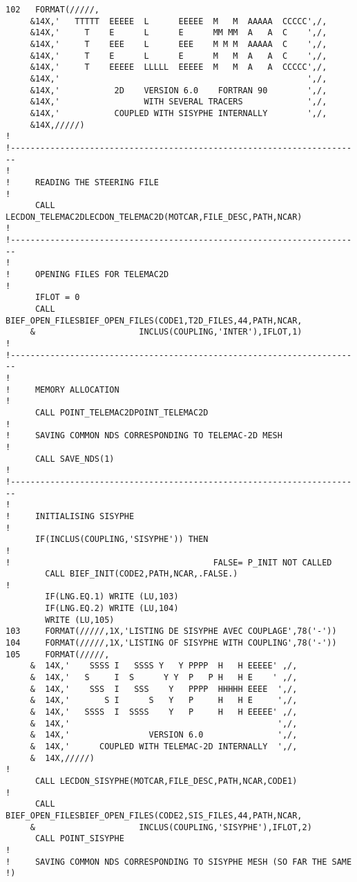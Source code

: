 \begin{lstlisting}[language=TelFortran]
102   FORMAT(/////,
     &14X,'   TTTTT  EEEEE  L      EEEEE  M   M  AAAAA  CCCCC',/,
     &14X,'     T    E      L      E      MM MM  A   A  C    ',/,
     &14X,'     T    EEE    L      EEE    M M M  AAAAA  C    ',/,
     &14X,'     T    E      L      E      M   M  A   A  C    ',/,
     &14X,'     T    EEEEE  LLLLL  EEEEE  M   M  A   A  CCCCC',/,
     &14X,'                                                  ',/,
     &14X,'           2D    VERSION 6.0    FORTRAN 90        ',/,
     &14X,'                 WITH SEVERAL TRACERS             ',/,
     &14X,'           COUPLED WITH SISYPHE INTERNALLY        ',/,
     &14X,/////)
!
!-----------------------------------------------------------------------
!
!     READING THE STEERING FILE
!
      CALL LECDON_TELEMAC2DLECDON_TELEMAC2D(MOTCAR,FILE_DESC,PATH,NCAR)
!
!-----------------------------------------------------------------------
!
!     OPENING FILES FOR TELEMAC2D
!
      IFLOT = 0
      CALL BIEF_OPEN_FILESBIEF_OPEN_FILES(CODE1,T2D_FILES,44,PATH,NCAR,
     &                     INCLUS(COUPLING,'INTER'),IFLOT,1)
!
!-----------------------------------------------------------------------
!
!     MEMORY ALLOCATION
!
      CALL POINT_TELEMAC2DPOINT_TELEMAC2D
!
!     SAVING COMMON NDS CORRESPONDING TO TELEMAC-2D MESH
!
      CALL SAVE_NDS(1)
!
!-----------------------------------------------------------------------
!
!     INITIALISING SISYPHE
!
      IF(INCLUS(COUPLING,'SISYPHE')) THEN
!
!                                         FALSE= P_INIT NOT CALLED
        CALL BIEF_INIT(CODE2,PATH,NCAR,.FALSE.)
!
        IF(LNG.EQ.1) WRITE (LU,103)
        IF(LNG.EQ.2) WRITE (LU,104)
        WRITE (LU,105)
103     FORMAT(/////,1X,'LISTING DE SISYPHE AVEC COUPLAGE',78('-'))
104     FORMAT(/////,1X,'LISTING OF SISYPHE WITH COUPLING',78('-'))
105     FORMAT(/////,
     &  14X,'    SSSS I   SSSS Y   Y PPPP  H   H EEEEE' ,/,
     &  14X,'   S     I  S      Y Y  P   P H   H E    ' ,/,
     &  14X,'    SSS  I   SSS    Y   PPPP  HHHHH EEEE  ',/,
     &  14X,'       S I      S   Y   P     H   H E     ',/,
     &  14X,'   SSSS  I  SSSS    Y   P     H   H EEEEE' ,/,
     &  14X,'                                          ',/,
     &  14X,'                VERSION 6.0               ',/,
     &  14X,'      COUPLED WITH TELEMAC-2D INTERNALLY  ',/,
     &  14X,/////)
!
      CALL LECDON_SISYPHE(MOTCAR,FILE_DESC,PATH,NCAR,CODE1)
!
      CALL BIEF_OPEN_FILESBIEF_OPEN_FILES(CODE2,SIS_FILES,44,PATH,NCAR,
     &                     INCLUS(COUPLING,'SISYPHE'),IFLOT,2)
      CALL POINT_SISYPHE
!
!     SAVING COMMON NDS CORRESPONDING TO SISYPHE MESH (SO FAR THE SAME !)

\end{lstlisting}
